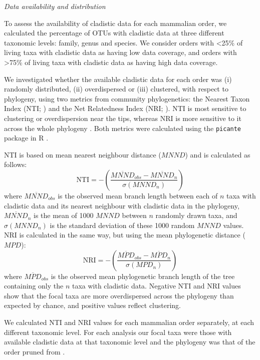 \documentclass[12pt,letterpaper]{article}
\renewcommand{\subsection}[1]{%
\bigskip
\begin{center}
\begin{large}
\normalfont\itshape #1
\end{large}
\end{center}}
\begin{document}
\subsection{Data availability and distribution}
To assess the availability of cladistic data for each mammalian order, we calculated the percentage of OTUs with cladistic data at three different taxonomic levels: family, genus and species.
We consider orders with \textless 25\% of living taxa with cladistic data as having low data coverage, and orders with \textgreater 75\% of living taxa with cladistic data as having high data coverage. 

We investigated whether the available cladistic data for each order was (i) randomly distributed, (ii) overdispersed or (iii) clustered, with respect to phylogeny, using two metrics from community phylogenetics: the Nearest Taxon Index (NTI; \cite{webb2002phylogenies}) and the Net Relatedness Index (NRI; \cite{webb2002phylogenies}). 
NTI is most sensitive to clustering or overdispersion near the tips, whereas NRI is more sensitive to it across the whole phylogeny \cite{Cooper2008}. 
Both metrics were calculated using the \texttt{picante} package in R \cite{picante,R}.

NTI \cite{webb2002phylogenies} is based on mean nearest neighbour distance ($MNND$) and is calculated as follows:
  \begin{equation}
    \text{NTI}=-\left(\frac{\overline{MNND}_{obs}-\overline{MNND}_{n}}{\sigma(MNND_{n})}\right)
  \end{equation}
where $\overline{MNND}_{obs}$ is the observed mean branch length between each of $n$ taxa with cladistic data and its nearest neighbour with cladistic data in the phylogeny, 
$\overline{MNND}_{n}$ is the mean of 1000 $MNND$ between $n$ randomly drawn taxa, and $\sigma(MNND_{n})$ is the standard deviation of these 1000 random $MNND$ values.
NRI is calculated in the same way, but using the mean phylogenetic distance ($MPD$):
  \begin{equation}
    \text{NRI}=-\left(\frac{\overline{MPD}_{obs}-\overline{MPD}_{n}}{\sigma(MPD_{n})}\right)
  \end{equation}
where $\overline{MPD}_{obs}$ is the observed mean phylogenetic branch length of the tree containing only the $n$ taxa with cladistic data.
Negative NTI and NRI values show that the focal taxa are more overdispersed across the phylogeny than expected by chance, and positive values reflect clustering.

We calculated NTI and NRI values for each mammalian order separately, at each different taxonomic level. 
For each analysis our focal taxa were those with available cladistic data at that taxonomic level and the phylogeny was that of the order pruned from \cite{BinindaEmonds}.
\end{document}
